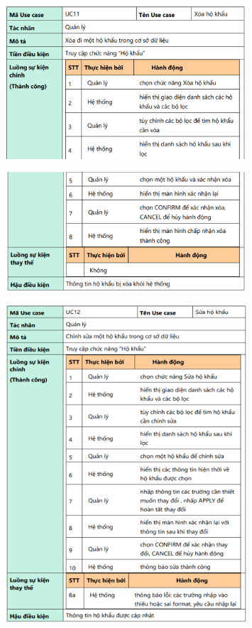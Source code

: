 \documentclass{article}
\begin{document}
\begin{itemize}
\begin{figure}[H]
        \includegraphics[width=0.8\textwidth]{Ảnh chương 2/UC11 1png.png}
    \end{figure}
    \begin{figure}[H]
        \centering
        \includegraphics[width=0.8\textwidth]{Ảnh chương 2/UC11.png}
    \end{figure}
    \begin{figure}[H]
        \centering
        \includegraphics[width=0.8\textwidth]{Ảnh chương 2/UC12.png}
    \end{figure}


\end{itemize}
\end{document}
